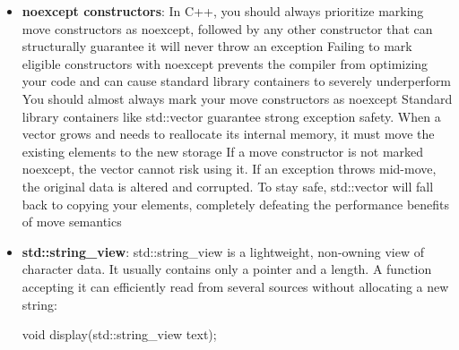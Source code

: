 \documentclass{report}
\begin{document}
\begin{itemize}
\begin{enumerate}
\begin{cppcode}
{{                                return *this;
                            }

                        private:
                            char* data_ = nullptr;
                            std::size_t size_ = 0;

                            void release();
                    };
                    \end{cppcode}
                    \bigbreak \noindent 
                    No std::move.
                    \bigbreak \noindent 
                    Because data\_ is a raw pointer, std::move(other.data\_) would have no useful effect. Moving and copying a raw pointer both copy its address.
                    \bigbreak \noindent 
                    If the member were a std::unique\_ptr<char[]>, then std::move would be necessary:

            \end{enumerate}
        \item \textbf{noexcept constructors}: In C++, you should always prioritize marking move constructors as noexcept, followed by any other constructor that can structurally guarantee it will never throw an exception
            \bigbreak \noindent 
            Failing to mark eligible constructors with noexcept prevents the compiler from optimizing your code and can cause standard library containers to severely underperform
            \bigbreak \noindent 
            You should almost always mark your move constructors as noexcept
            \bigbreak \noindent 
            Standard library containers like std::vector guarantee strong exception safety. When a vector grows and needs to reallocate its internal memory, it must move the existing elements to the new storage
            \bigbreak \noindent 
            If a move constructor is not marked noexcept, the vector cannot risk using it. If an exception throws mid-move, the original data is altered and corrupted. To stay safe, std::vector will fall back to copying your elements, completely defeating the performance benefits of move semantics
        \item \textbf{std::string\_view}: std::string\_view is a lightweight, non-owning view of character data. It usually contains only a pointer and a length. A function accepting it can efficiently read from several sources without allocating a new string:
            \bigbreak \noindent 
            \begin{cppcode}
                void display(std::string_view text);


\end{cppcode}
\end{itemize}
\end{document}
